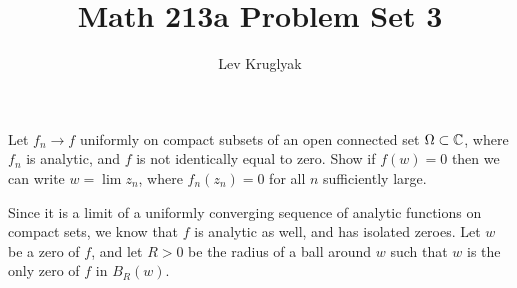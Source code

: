 \documentclass{pset}
\title{Math 213a Problem Set 3}
\author{Lev Kruglyak}
\begin{document}
\maketitle
\collaborators

\begin{problem}{9}
  Let $f_n \to f$ uniformly on compact subsets of an open connected set $\Omega \subset \mathbb{C}$, where $f_n$ is analytic, and $f$ is not identically equal to zero.
  Show if $f(w)=0$ then we can write $w = \lim z_n$, where $f_n(z_n)=0$ for all $n$ sufficiently large.
\end{problem}

\begin{solution}
  Since it is a limit of a uniformly converging sequence of analytic functions on compact sets, we know that $f$ is analytic as well, and has isolated zeroes. Let $w$ be a zero of $f$, and let $R>0$ be the radius of a ball around $w$ such that $w$ is the only zero of $f$ in $B_R(w)$.


\end{solution}
\end{document}
